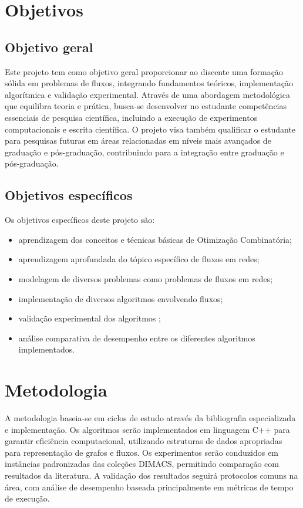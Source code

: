 \documentclass{amsart}
\begin{document}
\section{Objetivos}

\subsection{Objetivo geral}
Este projeto tem como objetivo geral proporcionar ao discente uma formação sólida em problemas de fluxos, integrando fundamentos teóricos, implementação algorítmica e validação experimental. Através de uma abordagem metodológica que equilibra teoria e prática, busca-se desenvolver no estudante competências essenciais de pesquisa científica, incluindo a execução de experimentos computacionais e escrita científica. O projeto visa também qualificar o estudante para pesquisas futuras em áreas relacionadas em níveis mais avançados de graduação e pós-graduação, contribuindo para a integração entre graduação e pós-graduação.

\subsection{Objetivos específicos}
Os objetivos específicos deste projeto são:
\begin{itemize}
    \item aprendizagem dos conceitos e técnicas básicas de Otimização Combinatória;
    \item aprendizagem aprofundada do tópico específico de fluxos em redes;
    \item modelagem de diversos problemas como problemas de fluxos em redes;
    \item implementação de diversos algoritmos envolvendo fluxos;
    \item validação experimental dos algoritmos ;
    \item análise comparativa de desempenho entre os diferentes algoritmos implementados.
\end{itemize}

\section{Metodologia}
A metodologia baseia-se em ciclos de estudo através da bibliografia especializada e implementação. Os algoritmos serão implementados em linguagem C++ para garantir eficiência computacional, utilizando estruturas de dados apropriadas para representação de grafos e fluxos. Os experimentos serão conduzidos em instâncias padronizadas das coleções DIMACS, permitindo comparação com resultados da literatura. A validação dos resultados seguirá protocolos comuns na área, com análise de desempenho baseada principalmente em métricas de tempo de execução.
\end{document}
